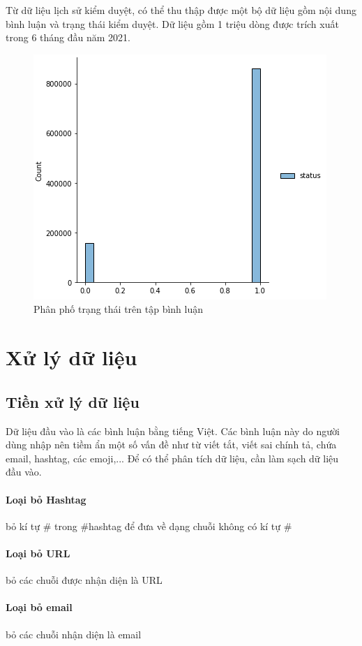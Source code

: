 \documentclass[runningheads]{llncs}
\begin{document}
Từ dữ liệu lịch sử kiểm duyệt, có thể thu thập được một bộ dữ liệu gồm nội dung bình luận và trạng thái kiểm duyệt. Dữ liệu gồm 1 triệu dòng được trích xuất trong 6 tháng đầu năm 2021.

\begin{figure}
\includegraphics[scale=0.7]{sns.png}
\centering
\caption{Phân phố trạng thái trên tập bình luận \label{figSeaborn}}
\end{figure}

\section{Xử lý dữ liệu}

\subsection{Tiền xử lý dữ liệu}

Dữ liệu đầu vào là các bình luận bằng tiếng Việt. Các bình luận này do người dùng nhập nên tiềm ẩn một số vấn đề như từ viết tắt, viết sai chính tả, chứa email, hashtag, các emoji,... Để có thể phân tích dữ liệu, cần làm sạch dữ liệu đầu vào.

\paragraph{Loại bỏ Hashtag} bỏ kí tự \# trong \#hashtag để đưa về dạng chuỗi không có kí tự \#
\paragraph{Loại bỏ URL} bỏ các chuỗi được nhận diện là URL
\paragraph{Loại bỏ email} bỏ các chuỗi nhận diện là email
\end{document}
